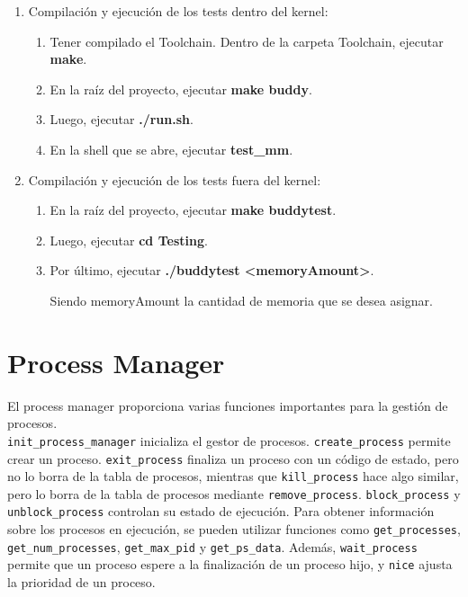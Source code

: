 \documentclass{article}
\begin{document}
\begin{enumerate}

\item Compilación y ejecución de los tests dentro del kernel:

\begin{enumerate}
    \item Tener compilado el Toolchain. Dentro de la carpeta Toolchain, ejecutar \textbf{make}.
    \item En la raíz del proyecto, ejecutar \textbf{make buddy}.
    \item Luego, ejecutar \textbf{./run.sh}.
    \item En la shell que se abre, ejecutar \textbf{test\_mm}.
\end{enumerate}

\item Compilación y ejecución de los tests fuera del kernel:

\begin{enumerate}
    \item En la raíz del proyecto, ejecutar \textbf{make buddytest}.
    \item Luego, ejecutar \textbf{cd Testing}.
    \item Por último, ejecutar \textbf{./buddytest \textless memoryAmount\textgreater}.

    Siendo memoryAmount la cantidad de memoria que se desea asignar.
\end{enumerate}
\end{enumerate}

\section {Process Manager}
El process manager proporciona varias funciones importantes para la gestión de procesos. \\
\texttt{init\_process\_manager} inicializa el gestor de procesos. \texttt{create\_process} permite crear un proceso. \texttt{exit\_process} finaliza un proceso con un código de estado, pero no lo borra de la tabla de procesos, mientras que \texttt{kill\_process} hace algo similar, pero lo borra de la tabla de procesos mediante \texttt{remove\_process}. \texttt{block\_process} y \texttt{unblock\_process} controlan su estado de ejecución. Para obtener información sobre los procesos en ejecución, se pueden utilizar funciones como \texttt{get\_processes}, \texttt{get\_num\_processes}, \texttt{get\_max\_pid} y \texttt{get\_ps\_data}. Además, \texttt{wait\_process} permite que un proceso espere a la finalización de un proceso hijo, y \texttt{nice} ajusta la prioridad de un proceso.
\end{document}
